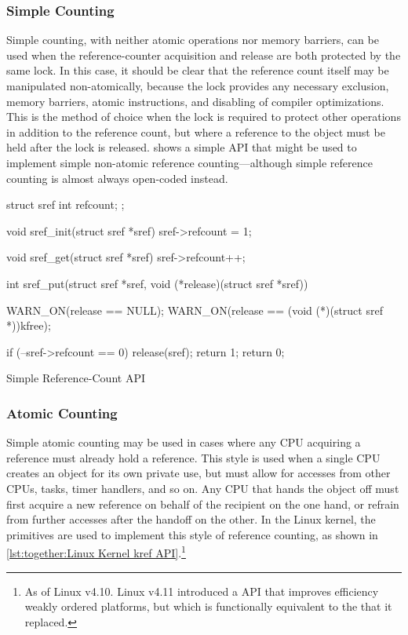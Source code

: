 \subsubsection{Simple Counting}
\label{sec:together:Simple Counting}

Simple counting, with neither atomic operations nor memory barriers,
can be used when the reference-counter acquisition and release are
both protected by the same lock.
In this case, it should be clear that the reference count itself
may be manipulated non-atomically, because the lock provides any
necessary exclusion, memory barriers, atomic instructions, and disabling
of compiler optimizations.
This is the method of choice when the lock is required to protect
other operations in addition to the reference count, but where
a reference to the object must be held after the lock is released.
 shows a simple
API that might be used to implement simple non-atomic reference
counting---although simple reference counting is almost always
open-coded instead.

\begin{listing}
\begin{fcvlabel}
\begin{VerbatimL}[commandchars=\\\[\]]
struct sref {
	int refcount;
};

void sref_init(struct sref *sref)
{
	sref->refcount = 1;
}

void sref_get(struct sref *sref)
{
	sref->refcount++;
}

int sref_put(struct sref *sref,
             void (*release)(struct sref *sref))
{
	WARN_ON(release == NULL);
	WARN_ON(release == (void (*)(struct sref *))kfree);

	if (--sref->refcount == 0) {
		release(sref);
		return 1;
	}
	return 0;
}
\end{VerbatimL}
\end{fcvlabel}
\caption{Simple Reference-Count API}
\label{lst:together:Simple Reference-Count API}
\end{listing}

\subsubsection{Atomic Counting}
\label{sec:together:Atomic Counting}

Simple atomic counting may be used in cases where any CPU acquiring
a reference must already hold a reference.
This style is used when a single CPU creates an object for its own private
use, but must allow for accesses from other CPUs, tasks, timer handlers,
and so on.
Any CPU that hands the object off must first acquire a new reference on
behalf of the recipient on the one hand, or refrain from further accesses
after the handoff on the other.
In the Linux kernel, the  primitives are used to implement
this style of reference counting, as shown in
\cref{lst:together:Linux Kernel kref API}.\footnote{
	As of Linux v4.10.
	Linux v4.11 introduced a  API that improves
	efficiency weakly ordered platforms, but which is functionally
	equivalent to the  that it replaced.}

